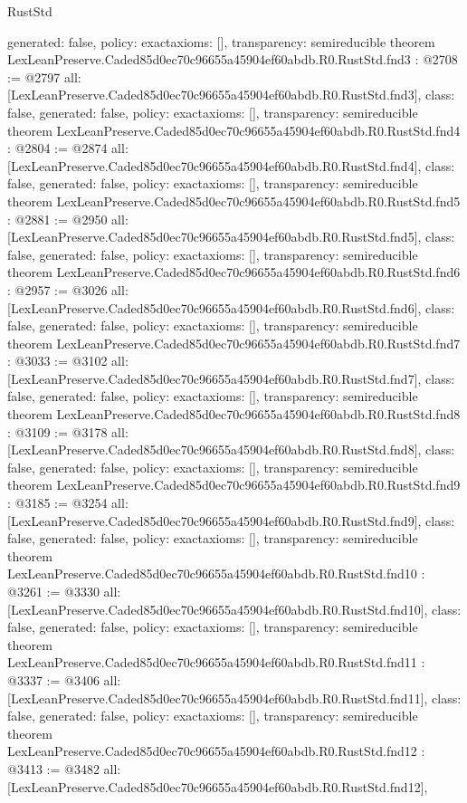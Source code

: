 \begin{lexlean}{RustStd}
\begin{coremodule}
{  generated: false,
  policy: exact{axioms: []},
  transparency: semireducible
}
theorem LexLeanPreserve.Caded85d0ec70c96655a45904ef60abdb.R0.RustStd.fnd3 : @2708 := @2797 {
  all: [LexLeanPreserve.Caded85d0ec70c96655a45904ef60abdb.R0.RustStd.fnd3],
  class: false,
  generated: false,
  policy: exact{axioms: []},
  transparency: semireducible
}
theorem LexLeanPreserve.Caded85d0ec70c96655a45904ef60abdb.R0.RustStd.fnd4 : @2804 := @2874 {
  all: [LexLeanPreserve.Caded85d0ec70c96655a45904ef60abdb.R0.RustStd.fnd4],
  class: false,
  generated: false,
  policy: exact{axioms: []},
  transparency: semireducible
}
theorem LexLeanPreserve.Caded85d0ec70c96655a45904ef60abdb.R0.RustStd.fnd5 : @2881 := @2950 {
  all: [LexLeanPreserve.Caded85d0ec70c96655a45904ef60abdb.R0.RustStd.fnd5],
  class: false,
  generated: false,
  policy: exact{axioms: []},
  transparency: semireducible
}
theorem LexLeanPreserve.Caded85d0ec70c96655a45904ef60abdb.R0.RustStd.fnd6 : @2957 := @3026 {
  all: [LexLeanPreserve.Caded85d0ec70c96655a45904ef60abdb.R0.RustStd.fnd6],
  class: false,
  generated: false,
  policy: exact{axioms: []},
  transparency: semireducible
}
theorem LexLeanPreserve.Caded85d0ec70c96655a45904ef60abdb.R0.RustStd.fnd7 : @3033 := @3102 {
  all: [LexLeanPreserve.Caded85d0ec70c96655a45904ef60abdb.R0.RustStd.fnd7],
  class: false,
  generated: false,
  policy: exact{axioms: []},
  transparency: semireducible
}
theorem LexLeanPreserve.Caded85d0ec70c96655a45904ef60abdb.R0.RustStd.fnd8 : @3109 := @3178 {
  all: [LexLeanPreserve.Caded85d0ec70c96655a45904ef60abdb.R0.RustStd.fnd8],
  class: false,
  generated: false,
  policy: exact{axioms: []},
  transparency: semireducible
}
theorem LexLeanPreserve.Caded85d0ec70c96655a45904ef60abdb.R0.RustStd.fnd9 : @3185 := @3254 {
  all: [LexLeanPreserve.Caded85d0ec70c96655a45904ef60abdb.R0.RustStd.fnd9],
  class: false,
  generated: false,
  policy: exact{axioms: []},
  transparency: semireducible
}
theorem LexLeanPreserve.Caded85d0ec70c96655a45904ef60abdb.R0.RustStd.fnd10 : @3261 := @3330 {
  all: [LexLeanPreserve.Caded85d0ec70c96655a45904ef60abdb.R0.RustStd.fnd10],
  class: false,
  generated: false,
  policy: exact{axioms: []},
  transparency: semireducible
}
theorem LexLeanPreserve.Caded85d0ec70c96655a45904ef60abdb.R0.RustStd.fnd11 : @3337 := @3406 {
  all: [LexLeanPreserve.Caded85d0ec70c96655a45904ef60abdb.R0.RustStd.fnd11],
  class: false,
  generated: false,
  policy: exact{axioms: []},
  transparency: semireducible
}
theorem LexLeanPreserve.Caded85d0ec70c96655a45904ef60abdb.R0.RustStd.fnd12 : @3413 := @3482 {
  all: [LexLeanPreserve.Caded85d0ec70c96655a45904ef60abdb.R0.RustStd.fnd12],
}
\end{coremodule}
\end{lexlean}
